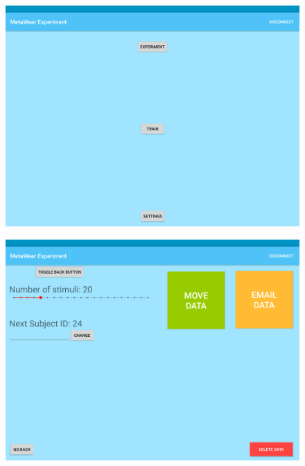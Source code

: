 \begin{figure}[h!]
\centering
\begin{minipage}{.55\textwidth}
  \centering
  \includegraphics[width=0.95\linewidth]{figures/tablet_screen0.png}
  \label{app_main}
\end{minipage}%
\begin{minipage}{.55\textwidth}
  \centering
  \includegraphics[width=0.95\linewidth]{figures/tablet_screen1.png}
  \label{app_settings}
\end{minipage}
\end{figure}

